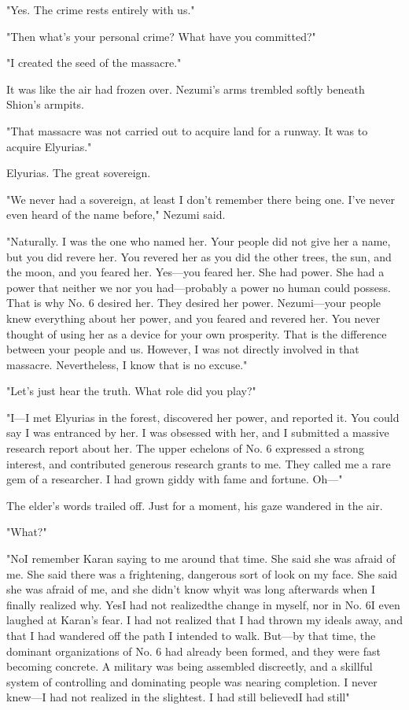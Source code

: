 "Yes. The crime rests entirely with us."

"Then what's your personal crime? What have you committed?"

"I created the seed of the massacre."

It was like the air had frozen over. Nezumi's arms trembled softly
beneath Shion's armpits.

"That massacre was not carried out to acquire land for a runway. It was
to acquire Elyurias."

Elyurias. The great sovereign.

\mybreak

"We never had a sovereign, at least I don't remember there being one.
I've never even heard of the name before," Nezumi said.

"Naturally. I was the one who named her. Your people did not give her a
name, but you did revere her. You revered her as you did the other
trees, the sun, and the moon, and you feared her. Yes---you feared her.
She had power. She had a power that neither we nor you had---probably a
power no human could possess. That is why No. 6 desired her. They
desired her power. Nezumi---your people knew everything about her power,
and you feared and revered her. You never thought of using her as a
device for your own prosperity. That is the difference between your
people and us. However, I was not directly involved in that massacre.
Nevertheless, I know that is no excuse."

"Let's just hear the truth. What role did you play?"

"I---I met Elyurias in the forest, discovered her power, and reported it.
You could say I was entranced by her. I was obsessed with her, and I
submitted a massive research report about her. The upper echelons of No.
6 expressed a strong interest, and contributed generous research grants
to me. They called me a rare gem of a researcher. I had grown giddy with
fame and fortune. Oh---"

The elder's words trailed off. Just for a moment, his gaze wandered in
the air.

"What?"

"No\el I remember Karan saying to me around that time. She said she was
afraid of me. She said there was a frightening, dangerous sort of look
on my face. She said she was afraid of me, and she didn't know why\el it
was long afterwards when I finally realized why. Yes\el I had not
realized\el the change in myself, nor in No. 6\el I even laughed at
Karan's fear. I had not realized that I had thrown my ideals away, and
that I had wandered off the path I intended to walk. But---by that time,
the dominant organizations of No. 6 had already been formed, and they
were fast becoming concrete. A military was being assembled discreetly,
and a skillful system of controlling and dominating people was nearing
completion. I never knew---I had not realized in the slightest. I had
still believed\el I had still\el "

